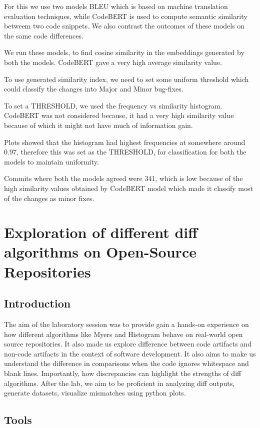 \documentclass[12pt, a4paper]{report}
\begin{document}
For this we use two models BLEU which is based on machine translation evaluation techniques, while CodeBERT is used to compute semantic similarity betweem two code snippets. We also contrast the outcomes of these models on the same code differences.

We run these models, to find cosine similarity in the embeddings generated by both the models. CodeBERT gave a very high average similarity value.

To use generated similarity index, we need to set some uniform threshold which could classify the changes into Major and Minor bug-fixes.

To set a THRESHOLD, we used the frequency vs similarity histogram. CodeBERT was not considered because, it had a very high similarity value because of which it might not have much of information gain.

Plots showed that the histogram had highest frequencies at somewhere around 0.97, therefore this was set as the THRESHOLD, for classification for both the models to maintain uniformity.

Commits where both the models agreed were 341, which is low because of the high similarity values obtained by CodeBERT model which made it classify most of the changes as minor fixes.

\newpage

\chapter{Exploration of different diff algorithms on Open-Source Repositories}

\section{Introduction}
The aim of the laboratory session was to provide gain a hands-on experience on how different algorithms like Myers and Histogram behave on real-world open source repositories. It also made us explore difference between code artifacts and non-code artifacts in the context of software development. It also aims to make us understand the difference in comparisons when the code ignores whitespace and blank lines. Importantly, how discrepancies can highlight the strengths of diff algorithms. After the lab, we aim to be proficient in analyzing diff outputs, generate datasets, visualize mismatches using python plots.

\section{Tools}
\end{document}
